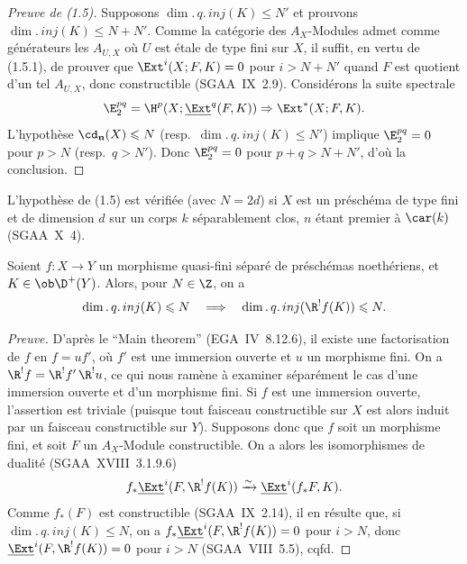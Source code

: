 \begin{proof}[Preuve de (1.5)]
Supposons $\dim.\,q.\,inj(K) \leqslant N'$ et prouvons $\dim.\,inj(K) \leqslant N + N'$. Comme la catégorie des $A_X$-Modules admet comme générateurs les $A_{U,X}$ où $U$ est étale de type fini sur $X$, il suffit, en vertu de (1.5.1), de prouver que $\Ext^i(X; F,K) = 0$ pour $i > N + N'$ quand $F$ est quotient d'un tel $A_{U,X}$, donc constructible (SGAA~IX~2.9). Considérons la suite spectrale
\[
\E_2^{pq} = \H^p(X; \underline{\Ext}^q(F,K)) \Rightarrow \Ext^{*}(X; F,K).
\]
L'hypothèse $\cd_{\mathbf{n}}(X) \leqslant N$ (resp.~$\dim.\,q.\,inj(K) \leqslant N'$) implique $\E_2^{pq} = 0$ pour $p > N$ (resp.~$q > N'$). Donc $\E_2^{pq} = 0$ pour $p+q > N+N'$, d'où la conclusion.
\end{proof}

\begin{remark}
L'hypothèse de (1.5) est vérifiée (avec $N = 2d$) si $X$ est un préschéma de type fini et de dimension $d$ sur un corps $k$ séparablement clos, $n$ étant premier à $\car(k)$ (SGAA~X~4).
\end{remark}

\begin{proposition}
Soient $f : X \to Y$ un morphisme quasi-fini séparé de préschémas noethériens, et $K \in \ob \D^{+}(Y)$. Alors, pour $N \in \Z$, on a
\[
\dim.\,q.\,inj(K) \leqslant N \quad \Longrightarrow \quad \dim.\,q.\,inj(\R^{!}f(K)) \leqslant N.
\]
\end{proposition}

\begin{proof}[Preuve]
D'après le ``Main theorem'' (EGA~IV~8.12.6), il existe une factorisation de $f$ en $f = uf'$, où $f'$ est une immersion ouverte et $u$ un morphisme fini. On a $\R^{!}f = \R^{!}f' \, \R^{!}u$, ce qui nous ramène à examiner séparément le cas d'une immersion ouverte et d'un morphisme fini. Si $f$ est une immersion ouverte, l'assertion est triviale (puisque tout faisceau constructible sur $X$ est alors induit par un faisceau constructible sur $Y$). Supposons donc que $f$ soit un morphisme fini, et soit $F$ un $A_X$-Module constructible. On a alors les isomorphismes de dualité (SGAA~XVIII~3.1.9.6)
\[
f_{*}\underline{\Ext}^i(F, \R^{!}f(K)) \xrightarrow{\sim} \underline{\Ext}^i(f_{*}F, K).
\]
Comme $f_{*}(F)$ est constructible (SGAA~IX~2.14), il en résulte que, si $\dim.\,q.\,inj(K) \leqslant N$, on a $f_{*}\underline{\Ext}^i(F, \R^{!}f(K)) = 0$ pour $i > N$, donc $\underline{\Ext}^i(F, \R^{!}f(K)) = 0$ pour $i > N$ (SGAA~VIII~5.5), cqfd.
\end{proof}

